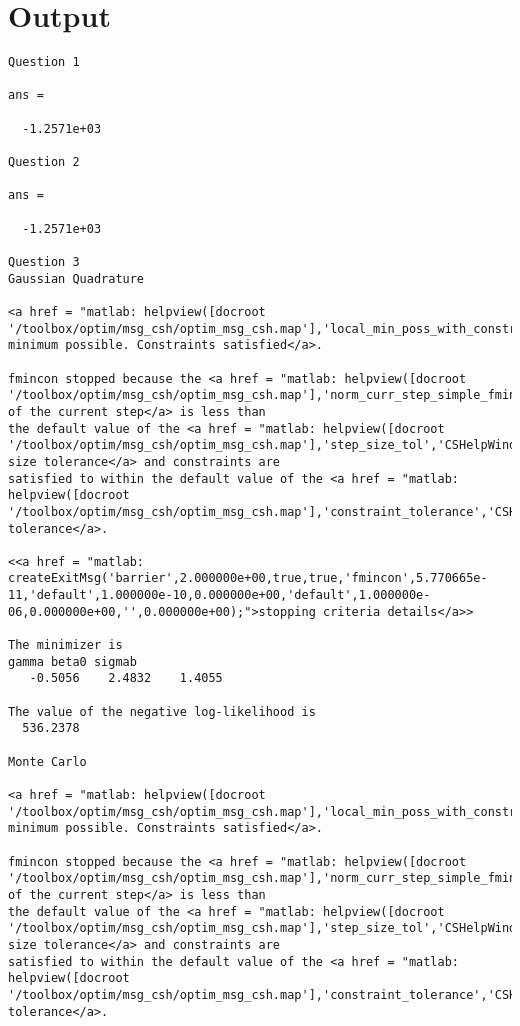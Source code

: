 \documentclass[12pt]{article}
\begin{document}
\section*{Output}
\begin{small}
\begin{verbatim}
Question 1

ans =

  -1.2571e+03

Question 2

ans =

  -1.2571e+03

Question 3
Gaussian Quadrature

<a href = "matlab: helpview([docroot '/toolbox/optim/msg_csh/optim_msg_csh.map'],'local_min_poss_with_constr','CSHelpWindow');">Local minimum possible. Constraints satisfied</a>.

fmincon stopped because the <a href = "matlab: helpview([docroot '/toolbox/optim/msg_csh/optim_msg_csh.map'],'norm_curr_step_simple_fminconip','CSHelpWindow');">size of the current step</a> is less than
the default value of the <a href = "matlab: helpview([docroot '/toolbox/optim/msg_csh/optim_msg_csh.map'],'step_size_tol','CSHelpWindow');">step size tolerance</a> and constraints are 
satisfied to within the default value of the <a href = "matlab: helpview([docroot '/toolbox/optim/msg_csh/optim_msg_csh.map'],'constraint_tolerance','CSHelpWindow');">constraint tolerance</a>.

<<a href = "matlab: createExitMsg('barrier',2.000000e+00,true,true,'fmincon',5.770665e-11,'default',1.000000e-10,0.000000e+00,'default',1.000000e-06,0.000000e+00,'',0.000000e+00);">stopping criteria details</a>>

The minimizer is
gamma beta0 sigmab
   -0.5056    2.4832    1.4055

The value of the negative log-likelihood is
  536.2378

Monte Carlo

<a href = "matlab: helpview([docroot '/toolbox/optim/msg_csh/optim_msg_csh.map'],'local_min_poss_with_constr','CSHelpWindow');">Local minimum possible. Constraints satisfied</a>.

fmincon stopped because the <a href = "matlab: helpview([docroot '/toolbox/optim/msg_csh/optim_msg_csh.map'],'norm_curr_step_simple_fminconip','CSHelpWindow');">size of the current step</a> is less than
the default value of the <a href = "matlab: helpview([docroot '/toolbox/optim/msg_csh/optim_msg_csh.map'],'step_size_tol','CSHelpWindow');">step size tolerance</a> and constraints are 
satisfied to within the default value of the <a href = "matlab: helpview([docroot '/toolbox/optim/msg_csh/optim_msg_csh.map'],'constraint_tolerance','CSHelpWindow');">constraint tolerance</a>.


\end{verbatim}
\end{small}
\end{document}
